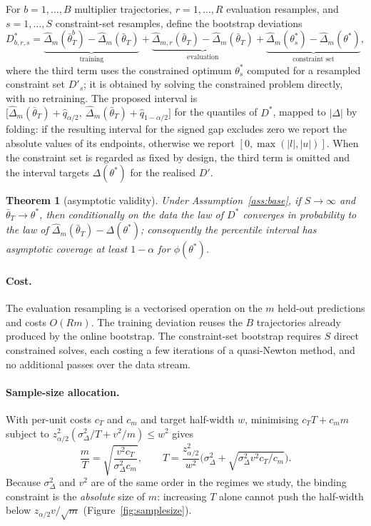 \documentclass[10pt,twocolumn]{article}
\newtheorem{theorem}{Theorem}
\newcommand{\dhat}{\hat\Delta}
\newcommand{\tbar}{\bar\theta}
\newcommand{\Dp}{D'}
\begin{document}
For $b=1,\dots,B$ multiplier trajectories, $r=1,\dots,R$ evaluation resamples, and $s=1,\dots,S$
constraint-set resamples, define the bootstrap deviations
\[
D^*_{b,r,s}
= \underbrace{\dhat_m(\bar\theta^b_T)-\dhat_m(\tbar_T)}_{\text{training}}
+ \underbrace{\dhat_{m,r}(\tbar_T)-\dhat_m(\tbar_T)}_{\text{evaluation}}
+ \underbrace{\dhat_{m}(\theta^*_s)-\dhat_m(\theta^*)}_{\text{constraint set}} ,
\]
where the third term uses the constrained optimum $\theta^*_s$ computed for a resampled constraint
set $\Dp_s$; it is obtained by solving the constrained problem directly, with no retraining.
The proposed interval is
$\big[\dhat_m(\tbar_T)+\hat q_{\alpha/2},\ \dhat_m(\tbar_T)+\hat q_{1-\alpha/2}\big]$
for the quantiles of $D^*$, mapped to $|\Delta|$ by folding: if the resulting interval for the signed
gap excludes zero we report the absolute values of its endpoints, otherwise we report
$[0,\max(|l|,|u|)]$.  When the constraint set is regarded as fixed by design, the third term is
omitted and the interval targets $\Delta(\theta^*)$ for the realised $\Dp$.

\begin{theorem}[asymptotic validity]
\label{thm:joint}
Under Assumption~\ref{ass:base}, if $S\to\infty$ and $\tbar_T\to\theta^*$, then conditionally on the
data the law of $D^*$ converges in probability to the law of
$\dhat_m(\tbar_T)-\Delta(\theta^*)$; consequently the percentile interval has asymptotic coverage at
least $1-\alpha$ for $\phi(\theta^*)$.
\end{theorem}

\paragraph{Cost.} The evaluation resampling is a vectorised operation on the $m$ held-out
predictions and costs $O(Rm)$.  The training deviation reuses the $B$ trajectories already produced
by the online bootstrap.  The constraint-set bootstrap requires $S$ direct constrained solves, each
costing a few iterations of a quasi-Newton method, and no additional passes over the data stream.

\paragraph{Sample-size allocation.}
\label{sec:ss}
With per-unit costs $c_T$ and $c_m$ and target half-width $w$, minimising $c_T T+c_m m$ subject to
$z_{\alpha/2}^2(\sigma^2_\Delta/T+v^2/m)\le w^2$ gives
\[
\frac{m}{T}=\sqrt{\frac{v^2c_T}{\sigma^2_\Delta c_m}},\qquad
T=\frac{z_{\alpha/2}^2}{w^2}\Big(\sigma^2_\Delta+\sqrt{\sigma^2_\Delta v^2 c_T/c_m}\Big).
\]
Because $\sigma^2_\Delta$ and $v^2$ are of the same order in the regimes we study, the binding
constraint is the \emph{absolute} size of $m$: increasing $T$ alone cannot push the half-width below
$z_{\alpha/2}v/\sqrt m$ (Figure~\ref{fig:samplesize}).
\end{document}
